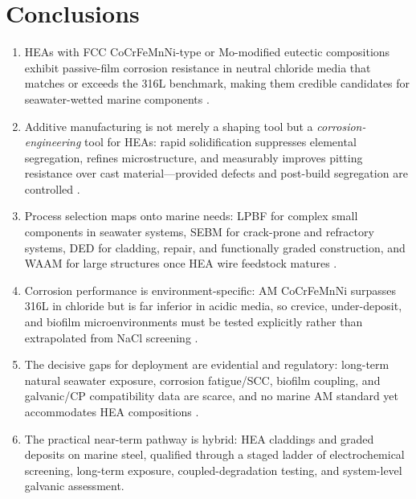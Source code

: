 \section{Conclusions}
\label{sec:conclusion}

\begin{enumerate}
\item HEAs with FCC CoCrFeMnNi-type or Mo-modified eutectic compositions exhibit passive-film corrosion resistance in neutral chloride media that matches or exceeds the 316L benchmark, making them credible candidates for seawater-wetted marine components \cite{qiu2017,lpbf_cantor_2024,mo_ehea_2026}.
\item Additive manufacturing is not merely a shaping tool but a \emph{corrosion-engineering} tool for HEAs: rapid solidification suppresses elemental segregation, refines microstructure, and measurably improves pitting resistance over cast material---provided defects and post-build segregation are controlled \cite{slm_ehea_2025,han2025,cagirici2024}.
\item Process selection maps onto marine needs: LPBF for complex small components in seawater systems, SEBM for crack-prone and refractory systems, DED for cladding, repair, and functionally graded construction, and WAAM for large structures once HEA wire feedstock matures \cite{cagirici2024,raultaiwade2021,jiang2019clad}.
\item Corrosion performance is environment-specific: AM CoCrFeMnNi surpasses 316L in chloride but is far inferior in acidic media, so crevice, under-deposit, and biofilm microenvironments must be tested explicitly rather than extrapolated from NaCl screening \cite{lpbf_cantor_2024}.
\item The decisive gaps for deployment are evidential and regulatory: long-term natural seawater exposure, corrosion fatigue/SCC, biofilm coupling, and galvanic/CP compatibility data are scarce, and no marine AM standard yet accommodates HEA compositions \cite{dnvstb203,abs_mam,lr_am}.
\item The practical near-term pathway is hybrid: HEA claddings and graded deposits on marine steel, qualified through a staged ladder of electrochemical screening, long-term exposure, coupled-degradation testing, and system-level galvanic assessment.
\end{enumerate}
